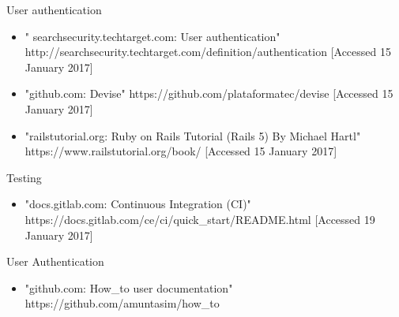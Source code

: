 \documentclass{l3proj}
\begin{document}
\label{authentication}
User authentication

\begin{itemize}

\item " searchsecurity.techtarget.com: User authentication"
\newline http://searchsecurity.techtarget.com/definition/authentication [Accessed 15 January 2017]

\item "github.com: Devise"
\newline https://github.com/plataformatec/devise [Accessed 15 January 2017]

\item "railstutorial.org: Ruby on Rails Tutorial (Rails 5) By Michael Hartl"
\newline https://www.railstutorial.org/book/ [Accessed 15 January 2017]

\end{itemize}

\label{testing}

Testing

\begin{itemize}

\item "docs.gitlab.com: Continuous Integration (CI)" 
\newline https://docs.gitlab.com/ce/ci/quick\_start/README.html [Accessed 19 January 2017]

\end{itemize}

\label{authentication}

User Authentication
\begin{itemize}

\item "github.com: How_to user documentation"
\newline https://github.com/amuntasim/how_to


\end{itemize}
\end{document}
